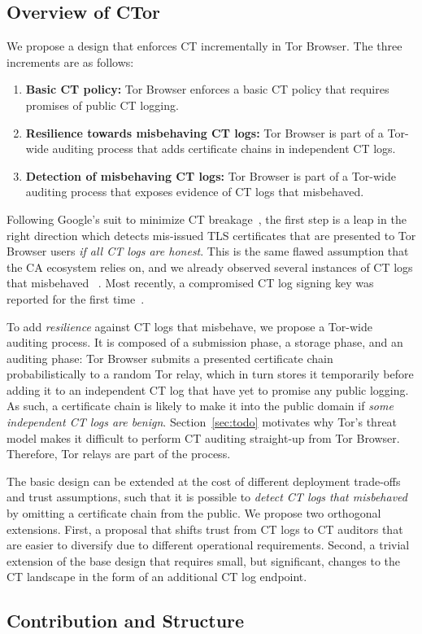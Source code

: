 \subsection{Overview of CTor}
We propose a design that enforces CT incrementally in Tor Browser.  The three
increments are as follows:
\begin{enumerate}
	\item \textbf{Basic CT policy:}
		Tor Browser enforces a basic CT policy that requires promises of public
		CT logging.
	\item \textbf{Resilience towards misbehaving CT logs:}
		Tor Browser is part of a Tor-wide auditing process that adds certificate
		chains in independent CT logs.
	\item \textbf{Detection of misbehaving CT logs:}
		Tor Browser is part of a Tor-wide auditing process that exposes evidence
		of CT logs that misbehaved.
\end{enumerate}

Following Google's suit to minimize CT breakage~\cite{does-ct-break-the-web},
the first step is a leap in the right direction which detects mis-issued TLS
certificates that are presented to Tor Browser users \emph{if all CT logs are
honest}.  This is the same flawed assumption that the CA ecosystem relies on,
and we already observed several instances of CT logs that misbehaved~%
	\cite{izenpe-disqualified,venafi-disqualified}.
Most recently, a compromised CT log signing key was reported for the first
time~\cite{digicert-log-compromised}.

To add \emph{resilience} against CT logs that misbehave, we propose a Tor-wide
auditing process.  It is composed of a submission phase, a storage phase, and
an auditing phase:
	Tor Browser submits a presented certificate chain probabilistically to
		a random Tor relay,
	which in turn stores it temporarily before adding it to an independent CT
		log that have yet to promise any public logging.
As such, a certificate chain is likely to make it into the public domain if
\emph{some independent CT logs are benign}.  Section~\ref{sec:todo} motivates
why Tor's threat model makes it difficult to perform CT auditing straight-up
from Tor Browser.  Therefore, Tor relays are part of the process.

The basic design can be extended at the cost of different deployment trade-offs
and trust assumptions, such that it is possible to \emph{detect CT logs that
misbehaved} by omitting a certificate chain from the public.  We propose two
orthogonal extensions.  First, a proposal that shifts trust from CT logs to CT
auditors that are easier to diversify due to different operational
requirements.  Second, a trivial extension of the base design that requires
small, but significant, changes to the CT landscape in the form of an
additional CT log endpoint.

\subsection{Contribution and Structure}
